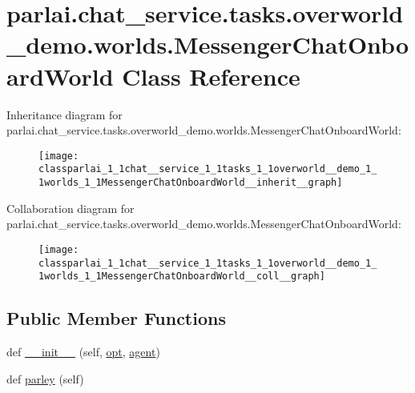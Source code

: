 \hypertarget{classparlai_1_1chat__service_1_1tasks_1_1overworld__demo_1_1worlds_1_1MessengerChatOnboardWorld}{}\section{parlai.\+chat\+\_\+service.\+tasks.\+overworld\+\_\+demo.\+worlds.\+Messenger\+Chat\+Onboard\+World Class Reference}
\label{classparlai_1_1chat__service_1_1tasks_1_1overworld__demo_1_1worlds_1_1MessengerChatOnboardWorld}


Inheritance diagram for parlai.\+chat\+\_\+service.\+tasks.\+overworld\+\_\+demo.\+worlds.\+Messenger\+Chat\+Onboard\+World\+:
\nopagebreak
\begin{figure}[H]
\begin{center}
\leavevmode
\texttt{[image: classparlai\_1\_1chat\_\_service\_1\_1tasks\_1\_1overworld\_\_demo\_1\_1worlds\_1\_1MessengerChatOnboardWorld\_\_inherit\_\_graph]}
\end{center}
\end{figure}


Collaboration diagram for parlai.\+chat\+\_\+service.\+tasks.\+overworld\+\_\+demo.\+worlds.\+Messenger\+Chat\+Onboard\+World\+:
\nopagebreak
\begin{figure}[H]
\begin{center}
\leavevmode
\texttt{[image: classparlai\_1\_1chat\_\_service\_1\_1tasks\_1\_1overworld\_\_demo\_1\_1worlds\_1\_1MessengerChatOnboardWorld\_\_coll\_\_graph]}
\end{center}
\end{figure}
\subsection*{Public Member Functions}
\begin{DoxyCompactItemize}
\item 
def \hyperlink{classparlai_1_1chat__service_1_1tasks_1_1overworld__demo_1_1worlds_1_1MessengerChatOnboardWorld_a6709ba38220d7f4f4b24869f26b3f341}{\+\_\+\+\_\+init\+\_\+\+\_\+} (self, \hyperlink{classparlai_1_1core_1_1worlds_1_1World_a3640d92718acd3e6942a28c1ab3678bd}{opt}, \hyperlink{classparlai_1_1chat__service_1_1tasks_1_1overworld__demo_1_1worlds_1_1MessengerChatOnboardWorld_a25d6bf779a4bf7dde0d6e88b0fbf86cb}{agent})
\item 
def \hyperlink{classparlai_1_1chat__service_1_1tasks_1_1overworld__demo_1_1worlds_1_1MessengerChatOnboardWorld_adcb17035083c1d5060c276c8bd00df96}{parley} (self)
\end{DoxyCompactItemize}

